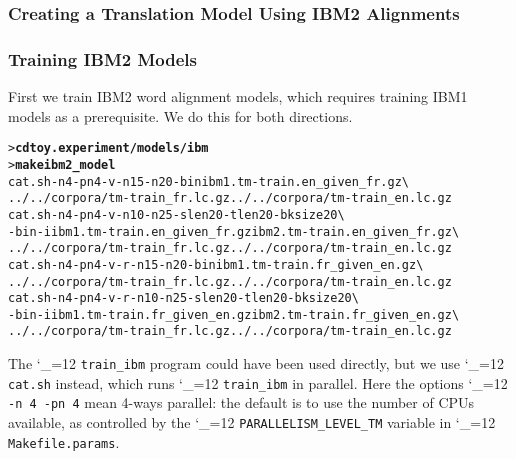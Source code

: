 \documentclass[11pt,letterpaper]{article}
\newcommand{\bs}{\textbackslash{}}
\newcommand{\TODO}[1]{\emph{\textbf{\textcolor{red}{<TODO> #1 </TODO>}}}}
\def\code{\begingroup\catcode`\_=12 \codex}
\newcommand{\codex}[1]{\texttt{#1}\endgroup}
\begin{document}
\subsubsection{Creating a Translation Model Using IBM2 Alignments} \label{IBM2}


\subsubsection*{Training IBM2 Models}

First we train IBM2 word alignment models, which requires training IBM1 models
as a prerequisite.  We do this for both directions.
\begin{small}
\begin{alltt}
   > \textbf{cd toy.experiment/models/ibm}
   > \textbf{make ibm2_model}
   cat.sh -n 4 -pn 4 -v -n1 5 -n2 0 -bin ibm1.tm-train.en_given_fr.gz \bs
      ../../corpora/tm-train_fr.lc.gz ../../corpora/tm-train_en.lc.gz
   cat.sh -n 4 -pn 4 -v -n1 0 -n2 5 -slen 20 -tlen 20 -bksize 20 \bs
      -bin -i ibm1.tm-train.en_given_fr.gz ibm2.tm-train.en_given_fr.gz \bs
      ../../corpora/tm-train_fr.lc.gz ../../corpora/tm-train_en.lc.gz
   cat.sh -n 4 -pn 4 -v -r -n1 5 -n2 0 -bin ibm1.tm-train.fr_given_en.gz \bs
      ../../corpora/tm-train_fr.lc.gz ../../corpora/tm-train_en.lc.gz
   cat.sh -n 4 -pn 4 -v -r -n1 0 -n2 5 -slen 20 -tlen 20 -bksize 20 \bs
      -bin -i ibm1.tm-train.fr_given_en.gz ibm2.tm-train.fr_given_en.gz \bs
      ../../corpora/tm-train_fr.lc.gz ../../corpora/tm-train_en.lc.gz
\end{alltt}
\end{small}
The \code{train_ibm} program could have been used directly, but we use
\code{cat.sh} instead, which runs \code{train_ibm} in parallel. Here the
options \code{-n 4 -pn 4} mean 4-ways parallel: the default is to use the
number of CPUs available, as controlled by the \code{PARALLELISM_LEVEL_TM}
variable in \code{Makefile.params}.
\end{document}
